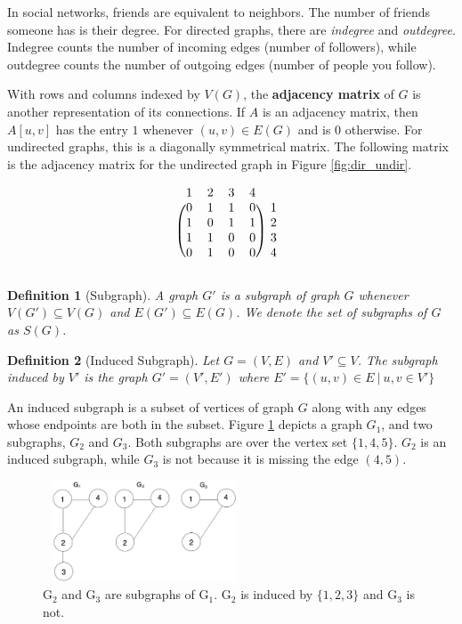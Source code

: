 \documentclass[12pt,twoside]{reedthesis}
\newtheorem{definition}{Definition} %
\begin{document}
In social networks, friends are equivalent to neighbors. The number of friends someone has is their degree. For directed graphs, there are \textit{indegree} and \textit{outdegree}. Indegree counts the number of incoming edges (number of followers), while outdegree counts the number of outgoing edges (number of people you follow).

With rows and columns indexed by $V(G)$, the \textbf{adjacency matrix} of $G$ is another representation of its connections. If $A$ is an adjacency matrix, then $A[u,v]$ has the entry $1$ whenever $(u,v) \in E(G)$ and is $0$ otherwise. For undirected graphs, this is a diagonally symmetrical matrix. The following matrix is the adjacency matrix for the undirected graph in Figure \ref{fig:dir_undir}.

\[
\begin{blockarray}{ccccc}
1&2&3&4 \\
\begin{block}{(cccc)c}
0&1&1&0&1 \\
1&0&1&1&2 \\
1&1&0&0&3 \\
0&1&0&0&4 \\
\end{block}
\end{blockarray}
 \]

\begin{definition} [Subgraph]
\label{def:subgraph}
A graph $G'$ is a subgraph of graph $G$ whenever $V(G') \subseteq V(G)$ and $E(G') \subseteq E(G)$. We denote the set of subgraphs of $G$ as $S(G)$.
\end{definition}

\begin{definition} [Induced Subgraph]
\label{def:induced_subgraph}
Let $G = (V,E)$ and $V' \subseteq V$. The subgraph induced by $V'$ is the graph $G' = (V',E')$ where $E' = \{(u,v) \in E \ | \ u,v \in V' \}$
\end{definition}

An induced subgraph is a subset of vertices of graph $G$ along with any edges whose endpoints are both in the subset. Figure \ref{fig:ind_sub} depicts a graph $G_{1}$, and two subgraphs, $G_{2}$ and  $G_{3}$. Both subgraphs are over the vertex set $\{1,4,5 \}$. $G_{2}$ is an induced subgraph, while $G_{3}$ is not because it is missing the edge $(4,5)$. 

\begin{figure}[h]
	\centering
	\includegraphics[width=6cm, height=3cm]{ind_sub}
	\caption[Induced Subgraphs]{G$_2$ and G$_3$ are subgraphs of G$_1$. G$_2$ is induced by $\{1,2,3\}$ and G$_3$ is not.}
	\label{fig:ind_sub}
\end{figure}
\end{document}
